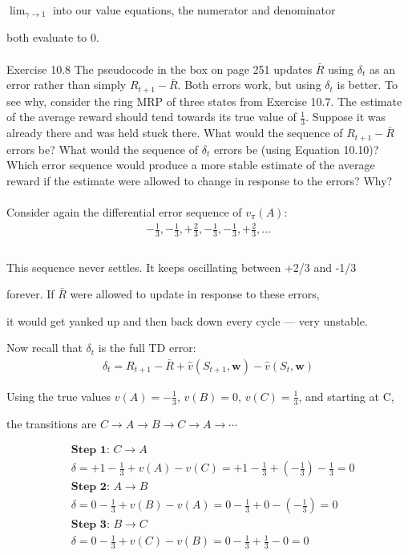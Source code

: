 \documentclass{article}
\begin{document}
$\lim_{\gamma \to 1}$ into our value equations, the numerator and denominator 

both evaluate to 0.
\\\\
{Exercise 10.8} The pseudocode in the box on page 251 updates $\bar{R}$ using $\delta_t$ as an error rather than simply $R_{t+1} - \bar{R}$. Both errors work, but using $\delta_t$ is better. To see why, consider the ring MRP of three states from Exercise 10.7. The estimate of the average reward should tend towards its true value of $\frac{1}{3}$. Suppose it was already there and was held stuck there. What would the sequence of $R_{t+1} - \bar{R}$ errors be? What would the sequence of $\delta_t$ errors be (using Equation 10.10)? Which error sequence would produce a more stable estimate of the average reward if the estimate were allowed to change in response to the errors? Why?
\\
\\
Consider again the differential error sequence of $v_{\pi}(A)$:
\begin{align*}
-\frac{1}{3}, -\frac{1}{3}, +\frac{2}{3}, -\frac{1}{3}, -\frac{1}{3}, +\frac{2}{3}, \ldots \\[10pt]
\end{align*}
\\

This sequence never settles. It keeps oscillating between +2/3 and -1/3

forever. If $\bar{R}$ were allowed to update in response to these errors, 

it would get yanked up and then back down every cycle — very unstable. 

Now recall that $\delta_t$ is the full TD error:
\begin{align*}
\delta_t = R_{t+1} - \bar{R} + \hat{v}(S_{t+1}, \mathbf{w}) - \hat{v}(S_t, \mathbf{w})
\end{align*}

Using the true values $v(A) = -\frac{1}{3}$, $v(B) = 0$, $v(C) = \frac{1}{3}$, and starting at C,

the transitions are $C \to A \to B \to C \to A \to \cdots$

\begin{align*}
&\textbf{Step 1: } C \to A \\
&\delta = +1 - \frac{1}{3} + v(A) - v(C) = +1 - \frac{1}{3} + \left(-\frac{1}{3}\right) - \frac{1}{3} = 0 \\[6pt]
&\textbf{Step 2: } A \to B \\
&\delta = 0 - \frac{1}{3} + v(B) - v(A) = 0 - \frac{1}{3} + 0 - \left(-\frac{1}{3}\right) = 0 \\[6pt]
&\textbf{Step 3: } B \to C \\
&\delta = 0 - \frac{1}{3} + v(C) - v(B) = 0 - \frac{1}{3} + \frac{1}{3} - 0 = 0
\end{align*}
\end{document}
